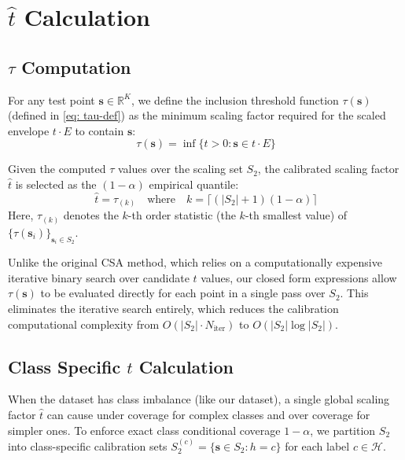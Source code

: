 \section{\texorpdfstring{$\hat{t}$}{t̂} Calculation}
\label{sec3.5: t hat calculation}

\subsection{\texorpdfstring{$\tau$ Computation}{tau Computation}}
\label{3.5.1: computation}
For any test point $\mathbf{s} \in \mathbb{R}^K$, we define the inclusion threshold function $\tau(\mathbf{s})$ (defined 
in \ref{eq: tau-def}) as the minimum scaling factor required for the scaled envelope $t \cdot E$ to contain $\mathbf{s}$:
\[\tau(\mathbf{s}) = \inf \{ t > 0 : \mathbf{s} \in t \cdot E \}\]

Given the computed $\tau$ values over the scaling set $S_2$, the calibrated scaling factor $\hat{t}$ is selected as 
the $(1-\alpha)$ empirical quantile:
\[\hat{t} = \tau_{(k)} \quad \text{where} \quad k = \lceil(|S_2|+1)(1-\alpha)\rceil\]
\noindent Here, $\tau_{(k)}$ denotes the $k$-th order statistic (the $k$-th smallest value) of $\{\tau(\mathbf{s}_i)\}_
{\mathbf{s}_i \in S_2}$. 

Unlike the original CSA method, which relies on a computationally expensive iterative binary search over candidate 
$t$ values, our closed form expressions allow $\tau(\mathbf{s})$ to be evaluated directly for each point in a single pass 
over $S_2$. This eliminates the iterative search entirely, which reduces the calibration computational complexity from 
$O(|S_2| \cdot N_{\text{iter}})$ to $O(|S_2| \log |S_2|)$.


\subsection{Class Specific \texorpdfstring{$\hat{t}$}{t̂} Calculation}
\label{sec3.5.2: class specific t hat}
When the dataset has class imbalance (like our dataset), a single global scaling factor $\hat{t}$ can cause under 
coverage for complex classes and over coverage for simpler ones. To enforce exact class conditional coverage $1 - \alpha$, 
we partition $S_2$ into class-specific calibration sets $S_2^{(c)} = \{\mathbf{s} \in S_2 : h = c\}$ for each label $c \in 
\mathcal{H}$.

